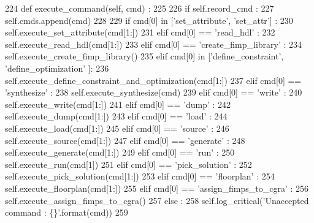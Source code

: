 \begin{DoxyCode}
224   \textcolor{keyword}{def }execute\_command(self, cmd) :
225 
226     \textcolor{keywordflow}{if} self.record\_cmd :
227       self.cmds.append(cmd)
228 
229     \textcolor{keywordflow}{if} cmd[0] \textcolor{keywordflow}{in} [\textcolor{stringliteral}{'set\_attribute'}, \textcolor{stringliteral}{'set\_attr'}] :
230       self.execute\_set\_attribute(cmd[1:])
231     \textcolor{keywordflow}{elif} cmd[0] == \textcolor{stringliteral}{'read\_hdl'} :
232       self.execute\_read\_hdl(cmd[1:])
233     \textcolor{keywordflow}{elif} cmd[0] == \textcolor{stringliteral}{'create\_fimp\_library'} :
234       self.execute\_create\_fimp\_library()
235     \textcolor{keywordflow}{elif} cmd[0] \textcolor{keywordflow}{in} [\textcolor{stringliteral}{'define\_constraint'}, \textcolor{stringliteral}{'define\_optimization'} ]:
236       self.execute\_define\_constraint\_and\_optimization(cmd[1:])
237     \textcolor{keywordflow}{elif} cmd[0] == \textcolor{stringliteral}{'synthesize'} :
238       self.execute\_synthesize(cmd)
239     \textcolor{keywordflow}{elif} cmd[0] == \textcolor{stringliteral}{'write'} :
240       self.execute\_write(cmd[1:])
241     \textcolor{keywordflow}{elif} cmd[0] == \textcolor{stringliteral}{'dump'} :
242       self.execute\_dump(cmd[1:])
243     \textcolor{keywordflow}{elif} cmd[0] == \textcolor{stringliteral}{'load'} :
244       self.execute\_load(cmd[1:])
245     \textcolor{keywordflow}{elif} cmd[0] == \textcolor{stringliteral}{'source'} :
246       self.execute\_source(cmd[1:])
247     \textcolor{keywordflow}{elif} cmd[0] == \textcolor{stringliteral}{'generate'} :
248       self.execute\_generate(cmd[1:])
249     \textcolor{keywordflow}{elif} cmd[0] == \textcolor{stringliteral}{'run'} :
250       self.execute\_run(cmd[1])
251     \textcolor{keywordflow}{elif} cmd[0] == \textcolor{stringliteral}{'pick\_solution'} :
252       self.execute\_pick\_solution(cmd[1:])
253     \textcolor{keywordflow}{elif} cmd[0] == \textcolor{stringliteral}{'floorplan'} :
254       self.execute\_floorplan(cmd[1:])
255     \textcolor{keywordflow}{elif} cmd[0] == \textcolor{stringliteral}{'assign\_fimps\_to\_cgra'} :
256       self.execute\_assign\_fimps\_to\_cgra()
257     \textcolor{keywordflow}{else} :
258       self.log\_critical(\textcolor{stringliteral}{'Unaccepted command : \{\}'}.format(cmd))
259 
\end{DoxyCode}
\mbox{\label{classsylva_1_1misc_1_1exec_1_1_s_y_l_v_a_a8a4492e65ade4e43b53de96f2201bc27}} 
